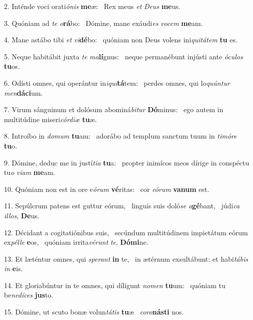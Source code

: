 2. Inténde voci orati\textit{ó}\textit{nis} \textbf{me}æ: \ast\  Rex meus \textit{et} \textit{De}\textit{us} \textbf{me}us.\

3. Quóniam ad \textit{te} \textit{o}\textbf{rá}bo: \ast\  Dómine, mane exáudi\textit{es} \textit{vo}\textit{cem} \textbf{me}am.\

4. Mane astábo tibi \textit{et} \textit{vi}\textbf{dé}bo: \ast\  quóniam non Deus volens ini\textit{qui}\textit{tá}\textit{tem} \textbf{tu} es.\

5. Neque habitábit juxta \textit{te} \textit{ma}\textbf{lí}gnus: \ast\  neque permanébunt injústi ante \textit{ó}\textit{cu}\textit{los} \textbf{tu}os.\

6. Odísti omnes, qui operántur in\textit{i}\textit{qui}\textbf{tá}tem: \ast\  perdes omnes, qui lo\textit{quún}\textit{tur} \textit{men}\textbf{dá}\textbf{ci}um.\

7. Virum sánguinum et dolósum abominá\textit{bi}\textit{tur} \textbf{Dó}minus: \ast\  ego autem in multitúdine miseri\textit{cór}\textit{di}\textit{æ} \textbf{tu}æ.\

8. Introíbo in \textit{do}\textit{mum} \textbf{tu}am: \ast\  adorábo ad templum sanctum tuum in \textit{ti}\textit{mó}\textit{re} \textbf{tu}o.\

9. Dómine, deduc me in justí\textit{ti}\textit{a} \textbf{tu}a: \ast\  propter inimícos meos dírige in conspéctu tu\textit{o} \textit{vi}\textit{am} \textbf{me}am.\

10. Quóniam non est in ore e\textit{ó}\textit{rum} \textbf{vé}ritas: \ast\  cor \textit{e}\textit{ó}\textit{rum} \textbf{va}\textbf{num} est.\

11. Sepúlcrum patens est guttur eórum, \dag\  linguis suis doló\textit{se} \textit{a}\textbf{gé}bant, \ast\  júdi\textit{ca} \textit{il}\textit{los}, \textbf{De}us.\

12. Décidant a cogitatiónibus suis, \dag\  secúndum multitúdinem impietátum eórum ex\textit{pél}\textit{le} \textbf{e}os, \ast\  quóniam irrita\textit{vé}\textit{runt} \textit{te}, \textbf{Dó}\textbf{mi}ne.\

13. Et læténtur omnes, qui \textit{spe}\textit{rant} \textbf{in} te, \ast\  in ætérnum exsultábunt: et habi\textit{tá}\textit{bis} \textit{in} \textbf{e}is.\

14. Et gloriabúntur in te omnes, qui díligunt \textit{no}\textit{men} \textbf{tu}um: \ast\  quóniam tu be\textit{ne}\textit{dí}\textit{ces} \textbf{jus}to.\

15. Dómine, ut scuto bonæ volun\textit{tá}\textit{tis} \textbf{tu}æ \ast\  \textit{co}\textit{ro}\textbf{nás}\textbf{ti} nos.\

